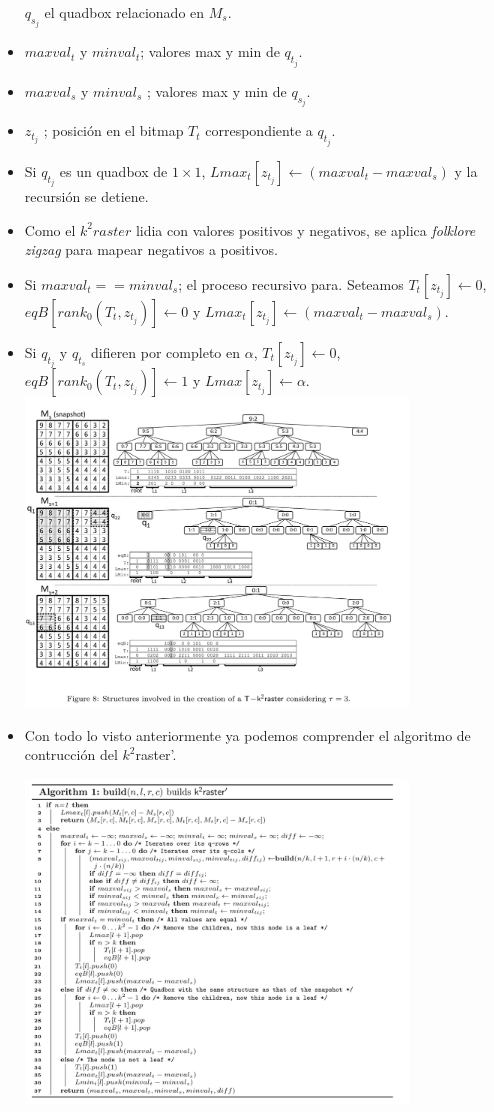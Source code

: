 \documentclass{article}
\begin{document}
\begin{itemize}
    $q_s_j$ el quadbox relacionado en $M_s$.
  \item $maxval_t$ y $minval_t$; valores max y min de $q_t_j$.
  \item $maxval_s$ y $minval_s$ ; valores max y min de $q_s_j$.
  \item $z_t_j$ ; posición en el bitmap $T_t$ correspondiente a $q_t_j$.
  \item Si $q_t_j$ es un quadbox de $1 \times 1$, $Lmax_t[z_t_j] \gets
    (maxval_t - maxval_s)$ y la recursión se detiene.
  \item Como el $k^2raster$ lidia con valores positivos y negativos, se aplica
    \emph{folklore zigzag} para mapear negativos a positivos.
  \item Si $maxval_t == minval_s$; el proceso recursivo para. Seteamos $T_t
    [z_t_j] \gets 0$, $eqB[rank_0(T_t,z_t_j)] \gets 0$ y $Lmax_t[z_t_j] \gets
    (maxval_t - maxval_s)$.
\item Si $q_t_j$ y $q_t_s$ difieren por completo en $\alpha$,
				$T_t[z_t_j] \gets 0$, $eqB[rank_0(T_t,z_t_j)] \gets 1$ y
			$Lmax[z_t_j] \gets \alpha$.
        \centering
        \includegraphics[width=0.8\textwidth]{../images/k2tin.png}
\item Con todo lo visto anteriormente ya podemos comprender el algoritmo de
  contrucción del $k^2$raster'.

    \centering
    \includegraphics[width=0.8\textwidth]{../images/al1.png}

\end{itemize}
\end{document}
